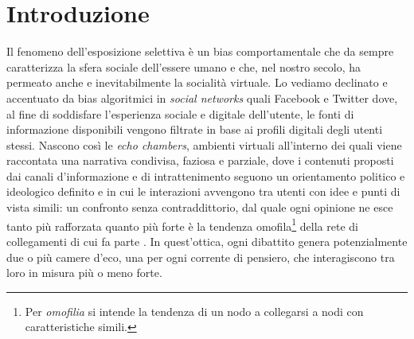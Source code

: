 \section{Introduzione}
    
    
     Il fenomeno dell'esposizione selettiva è un bias comportamentale che da sempre caratterizza la sfera sociale dell'essere umano e che, nel nostro secolo, ha permeato anche e inevitabilmente la socialità virtuale. Lo vediamo declinato e accentuato da bias algoritmici in \textit{social networks} quali Facebook e Twitter dove, al fine di soddisfare l'esperienza sociale e digitale dell'utente, le fonti di informazione disponibili vengono filtrate in base ai profili digitali degli utenti stessi. Nascono così le \textit{echo chambers}, ambienti virtuali all'interno dei quali viene raccontata una narrativa condivisa, faziosa e parziale, dove i contenuti proposti dai canali d'informazione e di intrattenimento seguono un orientamento politico e ideologico definito e in cui le interazioni avvengono tra utenti con idee e punti di vista simili: un confronto senza contraddittorio, dal quale ogni opinione ne esce tanto più rafforzata quanto più forte è la tendenza omofila\footnote{Per \textit{omofilia} si intende la tendenza di un nodo a collegarsi a nodi con caratteristiche simili.} della rete di collegamenti di cui fa parte \cite{Cinellie2023301118}. In quest'ottica, ogni dibattito genera potenzialmente due o più camere d'eco, una per ogni corrente di pensiero, che interagiscono tra loro in misura più o meno forte. 
     
